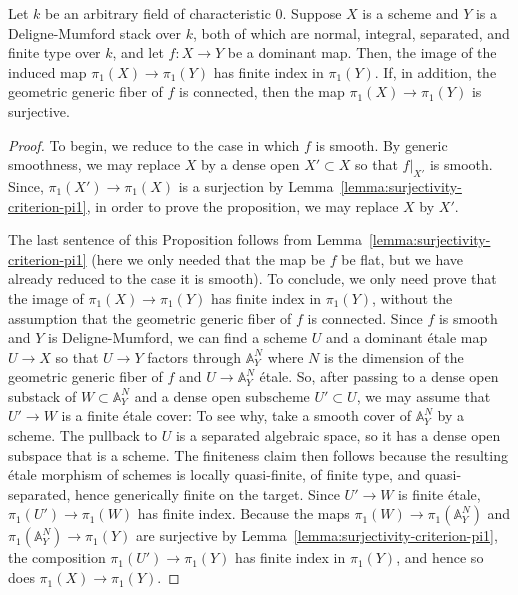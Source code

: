 \begin{proposition} \label{proposition:stacky-dominant-map-surjective-fundamental-group}
Let $k$ be an arbitrary field of characteristic $0$. Suppose $X$ is a scheme and $Y$ is a Deligne-Mumford stack over $k$, both of which are normal, integral, separated, and finite type over $k$, and let $f\colon X \rightarrow Y$ be a dominant map.
Then, the image of the induced map
       $\pi_1(X) \rightarrow \pi_1(Y)$ has finite index in $\pi_1(Y)$. If, in addition, the geometric
       generic fiber of $f$ is connected, then the map $\pi_1(X) \rightarrow \pi_1(Y)$ is surjective.
\end{proposition}
\begin{proof}
To begin, we reduce to the case in which $f$ is smooth.
By generic smoothness, we may replace $X$
by a dense open $X' \subset X$ so that $f|_{X'}$ is smooth.
Since, $\pi_1(X') \rightarrow \pi_1(X)$ is a surjection by Lemma~\ref{lemma:surjectivity-criterion-pi1}, in order to prove the proposition, we may replace $X$ by $X'$.

The last sentence of this Proposition follows from Lemma~\ref{lemma:surjectivity-criterion-pi1} (here we only needed that the map be $f$ be flat, but we have already reduced to the case it is smooth). To conclude, we only need prove that the image of $\pi_1(X)\rightarrow \pi_1(Y)$ has finite index in $\pi_1(Y)$, without the assumption that the geometric generic fiber of $f$ is connected. Since $f$ is smooth and $Y$ is Deligne-Mumford, we can find a scheme $U$ and a dominant \'etale map $U \rightarrow X$ so that $U \rightarrow Y$ factors through $\mathbb A^N_Y$ where $N$ is the dimension of the geometric generic fiber of $f$ and $U \rightarrow \mathbb A^N_Y$ \'etale.
So, after passing to a dense open substack of $W \subset \mathbb A^N_Y$ and a dense open subscheme $U' \subset U$, we may assume that $U' \rightarrow W$ is a finite \'etale cover:
To see why, take a smooth cover of $\mathbb A^N_Y$ by a scheme. The pullback to $U$ is a separated algebraic space, so it has a dense open subspace that is a scheme. The finiteness claim then follows because the resulting \'etale morphism of schemes is locally quasi-finite, of finite type, and quasi-separated, hence generically finite on the target.
Since $U' \rightarrow W$ is finite \'etale, $\pi_1(U') \rightarrow \pi_1(W)$ has finite index.
Because the maps $\pi_1(W) \rightarrow \pi_1(\mathbb A^N_Y)$ and $\pi_1(\mathbb A^N_Y) \rightarrow \pi_1(Y)$ are surjective by Lemma~\ref{lemma:surjectivity-criterion-pi1}, the composition $\pi_1(U') \rightarrow \pi_1(Y)$ has finite index in $\pi_1(Y)$, and hence so does $\pi_1(X) \rightarrow \pi_1(Y)$.
\end{proof}


